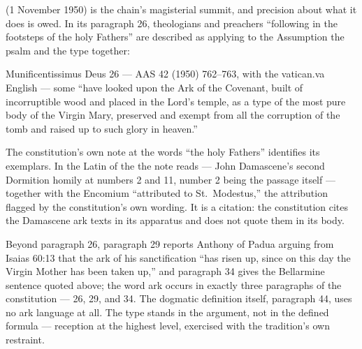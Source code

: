  (1 November 1950) is the chain's magisterial
summit, and precision about what it does is owed. In its paragraph 26,
theologians and preachers ``following in the footsteps of the holy Fathers''
are described as applying to the Assumption the psalm and the type together:

\begin{witnessbox}{Munificentissimus Deus 26 --- AAS 42 (1950) 762--763, with the vatican.va English}
 --- some ``have looked upon the Ark
of the Covenant, built of incorruptible wood and placed in the Lord's temple,
as a type of the most pure body of the Virgin Mary, preserved and exempt from
all the corruption of the tomb and raised up to such glory in heaven.''
\end{witnessbox}

The constitution's own note at the words ``the holy Fathers'' identifies its
exemplars. In the Latin of the  the note reads
 --- John Damascene's second Dormition homily at
numbers 2 and 11, number 2 being the  passage
itself --- together with the Encomium ``attributed to St.\ Modestus,'' the
attribution flagged by the constitution's own wording. It is a 
citation: the constitution cites the Damascene ark texts in its apparatus
and does not quote them in its body.

Beyond paragraph 26, paragraph 29 reports Anthony of Padua arguing from
Isaias 60:13 that the ark of his sanctification ``has risen up, since on
this day the Virgin Mother has been taken up,'' and paragraph 34 gives the
Bellarmine sentence quoted above; the word ark occurs in exactly three
paragraphs of the constitution --- 26, 29, and 34. The dogmatic definition
itself, paragraph 44, uses no ark language at all. The type stands in the
argument, not in the defined formula --- reception at the highest level,
exercised with the tradition's own
restraint.

